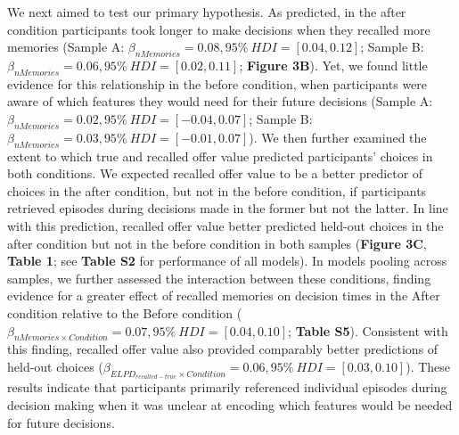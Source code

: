 \documentclass[10pt,letterpaper]{article}
\begin{document}
We next aimed to test our primary hypothesis. As predicted, in the after condition participants took longer to make decisions when they recalled more memories (Sample A: $\beta_{nMemories} = 0.08, 95\% \ HDI = [0.04, 0.12]$; Sample B: $\beta_{nMemories} = 0.06, 95\% \ HDI = [0.02, 0.11]$; \textbf{Figure 3B}). Yet, we found little evidence for this relationship in the before condition, when participants were aware of which features they would need for their future decisions (Sample A: $\beta_{nMemories} = 0.02, 95\% \ HDI = [-0.04, 0.07]$; Sample B: $\beta_{nMemories} = 0.03, 95\% \ HDI = [-0.01, 0.07]$). We then further examined the extent to which true and recalled offer value predicted participants' choices in both conditions. We expected recalled offer value to be a better predictor of choices in the after condition, but not in the before condition, if participants retrieved episodes during decisions made in the former but not the latter. In line with this prediction, recalled offer value better predicted held-out choices in the after condition but not in the before condition in both samples (\textbf{Figure 3C}, \textbf{Table 1}; see \textbf{Table S2} for performance of all models). In models pooling across samples, we further assessed the interaction between these conditions, finding evidence for a greater effect of recalled memories on decision times in the After condition relative to the Before condition ($\beta_{nMemories\times Condition} = 0.07, 95\% \ HDI = [0.04, 0.10]$; \textbf{Table S5}). Consistent with this finding, recalled offer value also provided comparably better predictions of held-out choices ($\beta_{ELPD_{recalled-true}\times Condition} = 0.06, 95\% \ HDI = [0.03, 0.10]$). These results indicate that participants primarily referenced individual episodes during decision making when it was unclear at encoding which features would be needed for future decisions.
\end{document}
